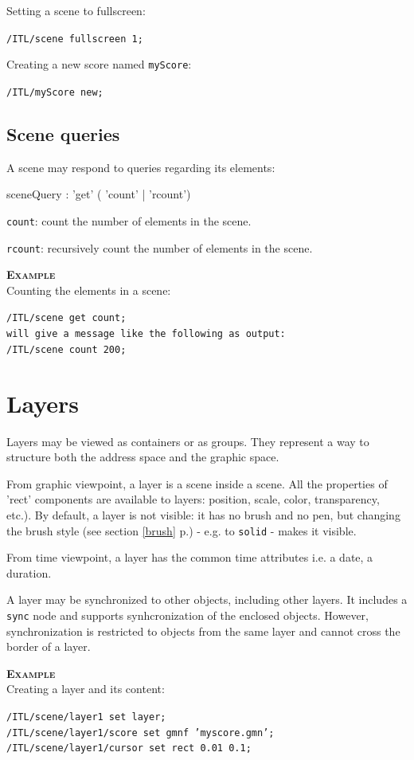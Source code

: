 \documentclass[a4paper,twoside]{report}
\newcommand{\toplevel}[1]	{\chapter{#1}}
\newcommand{\sublevel}[1]	{\section{#1}}
\newcommand{\fullref}[1]	{\ref{#1} p.\pageref{#1}}
\newcommand{\OSC}[1]		{\texttt{#1}}
\newcommand{\example}		{\textbf{\hspace{-1.5cm}\textbf{\textsc{Example }}}}
\let\olditemize\itemize
\let\oldenditemize\enditemize
\renewenvironment{itemize} 	{\olditemize \setlength{\itemsep}{1mm}}{\oldenditemize}
\newcommand{\sample}	[1]			{\vspace{-2mm}\begin{center}\colorbox{mygrey}{
								\begin{minipage}[t]{0.9\columnwidth} 
								{\small \texttt{#1}}
								\end{minipage}}\end{center}}
\begin{document}
Setting a scene to fullscreen:
\sample{/ITL/scene fullscreen 1;}
Creating a new score named \OSC{myScore}:
\sample{/ITL/myScore new;}


\sublevel{Scene queries}
\label{scenequery}

A scene may respond to queries regarding its elements:
\begin{rail}
sceneQuery : 'get' ( 'count'
					| 'rcount')
\end{rail}

\begin{itemize}
\item \OSC{count}: count the number of elements in the scene.
\item \OSC{rcount}: recursively count the number of elements in the scene.
\end{itemize}

\example \\
Counting the elements in a scene:
\sample{/ITL/scene get count;\\
\hspace*{5mm}will give a message like the following as output: \\
/ITL/scene count 200;
}



\toplevel{Layers}
\label{layers}

Layers may be viewed as containers or as groups. They represent a way to structure both the address space and the graphic space. 

From graphic viewpoint, a layer is a scene inside a scene. All the properties of 'rect' components are available to layers: position, scale, color, transparency, etc.). By default, a layer is not visible: it has no brush and no pen, but changing the brush style (see section \fullref{brush}) - e.g. to \OSC{solid} - makes it visible.

From time viewpoint, a layer has the common time attributes i.e. a date, a duration.

A layer may be synchronized to other objects, including other layers. It includes a \OSC{sync} node and supports synhcronization of the enclosed objects. However, synchronization is restricted to objects from the same layer and cannot cross the border of a layer. 


\example \\
Creating a layer and its content:
\sample{/ITL/scene/layer1 set layer;\\
/ITL/scene/layer1/score set gmnf 'myscore.gmn';\\
/ITL/scene/layer1/cursor set rect 0.01 0.1;}
\end{document}
